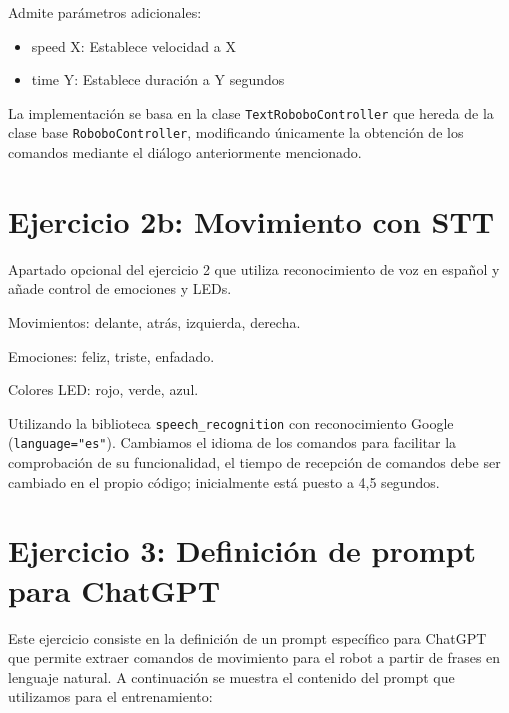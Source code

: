 \documentclass{article}
\begin{document}
Admite parámetros adicionales:
\begin{itemize}
\item speed X: Establece velocidad a X
\item time Y: Establece duración a Y segundos
\end{itemize}

La implementación se basa en la clase \texttt{TextRoboboController} que hereda de la clase base \texttt{RoboboController}, modificando únicamente la obtención de los comandos mediante el diálogo anteriormente mencionado.

\section*{Ejercicio 2b: Movimiento con STT}

Apartado opcional del ejercicio 2 que utiliza reconocimiento de voz en español y añade control de emociones y LEDs.

Movimientos: delante, atrás, izquierda, derecha.

Emociones: feliz, triste, enfadado.

Colores LED: rojo, verde, azul.

Utilizando la biblioteca \texttt{speech\_recognition} con reconocimiento Google (\texttt{language="es"}). Cambiamos el idioma de los comandos para facilitar la comprobación de su funcionalidad, el tiempo de recepción de comandos debe ser cambiado en el propio código; inicialmente está puesto a 4,5 segundos.

\section*{Ejercicio 3: Definición de prompt para ChatGPT}

Este ejercicio consiste en la definición de un prompt específico para ChatGPT que permite extraer comandos de movimiento para el robot a partir de frases en lenguaje natural. A continuación se muestra el contenido del prompt que utilizamos para el entrenamiento:
\end{document}
